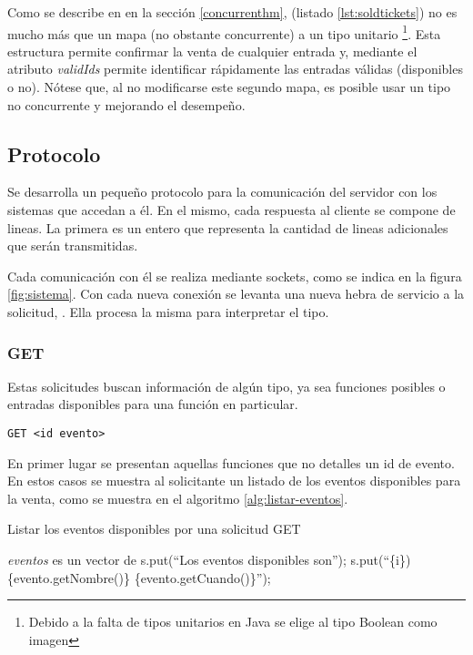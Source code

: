 

Como se describe en en la sección \ref{concurrenthm},  (listado \ref{lst:soldtickets}) no es mucho más que un mapa (no obstante concurrente) a un tipo unitario
\footnote{Debido a la falta de tipos unitarios en Java se elige al tipo Boolean como imagen}.
Esta estructura permite confirmar la venta de cualquier entrada y, mediante el atributo \emph{validIds} permite identificar rápidamente las entradas válidas (disponibles o no).
Nótese que, al no modificarse este segundo mapa, es posible usar un tipo no concurrente y mejorando el desempeño.




\subsection{Protocolo}
Se desarrolla un pequeño protocolo para la comunicación del servidor con los sistemas que accedan a él.
En el mismo, cada respuesta al cliente se compone de lineas.
La primera es un entero que representa la cantidad de lineas adicionales que serán transmitidas.

Cada comunicación con él se realiza mediante sockets, como se indica en la figura \ref{fig:sistema}.
Con cada nueva conexión se levanta una nueva hebra de servicio a la solicitud, .
Ella procesa la misma para interpretar el tipo.

\subsubsection{GET}
Estas solicitudes buscan información de algún tipo, ya sea funciones posibles o entradas disponibles para una función en particular.
\begin{center}
	\texttt{GET <id evento>}
\end{center}

En primer lugar se presentan aquellas funciones que no detalles un id de evento.
En estos casos se muestra al solicitante un listado de los eventos disponibles para la venta,
como se muestra en el algoritmo \ref{alg:listar-eventos}.

\begin{algorithm}
\caption{Listar los eventos disponibles por una solicitud GET}
\label{alg:listar-eventos}
\begin{algorithmic}[1]
	\Require \emph{eventos} es un vector de 
\State s.put(``Los eventos disponibles son'');
	\State s.put(``\{i\}) \{evento.getNombre()\} \{evento.getCuando()\}'');
\EndFor
\EndProcedure
\end{algorithmic}
\end{algorithm}

